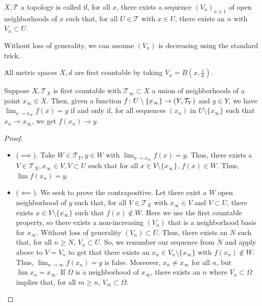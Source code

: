 \documentclass[11pt,leqno,oneside]{amsbook}
\numberwithin{thm}{section}
\newcommand{\Top}{\mathcal{T}} %
\begin{document}
\begin{defn}
  \(X,\Top\) a topology is called  if, for all
  \(x\), there exists a sequence \((V_n)_{n \geq 1}\) of open
  neighborhoods of \(x\) such that, for all \(U \in \Top\) with \(x
  \in U\), there exists an \(n\) with \(V_n \subset U\).
\end{defn}
Without loss of generality, we can assume \((V_n)\) is decreasing
using the standard trick.
\begin{example}
  All metric spaces \(X,d\) are first countable by taking \(V_n =
  B(x,\frac{1}{n})\).
\end{example}
\begin{prop}\label{seq-char-of-lims}
  Suppose \(X, \Top_X\) is first countable with \(\Top_\infty \subset
  X\) a union of neighborhoods of a point \(x_\infty \in X\). Then,
  given a function \(f \from U \setminus \{x_\infty\} \to (Y,
  \Top_Y)\) and \(y \in Y\), we have \(\lim_{x \to x_\infty} f(x) = y\)
  if and only if, for all sequences \((x_n)\) in \(U \setminus
  \{x_\infty\}\) such that \(x_n \to x_\infty\), we get \(f(x_n) \to y\).
\end{prop}
\begin{proof}
  \begin{itemize}
  \item (\(\implies\)). Take \(W \in \Top_Y, y \in W\) with \(\lim_{x
      \to x_\infty} f(x) = y\). Thus, there exists a \(V \in \Top_X,
    x_\infty \in V, V \subset U\) such that for all \(x \in V
    \setminus \{x_\infty\}\), \(f(x) \in W\). Thus, \(\lim f(x_n) =
    y\).
  \item (\(\impliedby\)). We seek to prove the contrapositive. Let
    there exist a \(W\) open neighborhood of \(y\) such that, for all
    \(V \in \Top_X\) with \(x_\infty \in V\) and \(V \subset U\),
    there exists \(x \in V \setminus \{x_\infty\}\) such that \(f(x)
    \not \in W\). Here we use the first countable property, so there
    exists a non-increasing \((V_n)\) that is a neighborhood basis for
    \(x_\infty\). Without loss of generality \((V_n) \subset
    U\). Thus, there exists an \(N\) such that, for all \(n \geq N\),
    \(V_n \subset U\). So, we renumber our sequence from \(N\) and
    apply above to \(V = V_n\) to get that there exists an \(x_n \in
    V_n \setminus \{x_\infty\}\) with \(f(x_n) \not \in W\). Thus,
    \(\lim_{n \to \infty} f(x_n) = y\) is false. Moreover, \(x_n \neq
    x_\infty\) for all \(n\), but \(\lim x_n = x_\infty\). If
    \(\Omega\) is a neighborhood of \(x_\infty\), there exists an
    \(n\) where \(V_n \subset \Omega\) implies that, for all \(m \geq
    n\), \(V_m \subset \Omega\).
  \end{itemize}
\end{proof}
\end{document}
